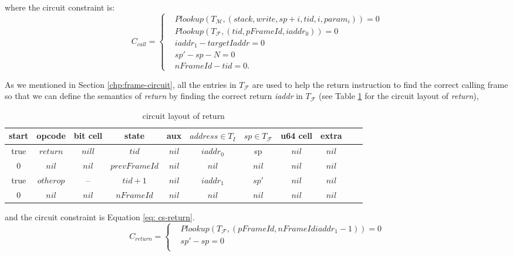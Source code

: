 \noindent where the circuit constraint is:
\[
    C_{call} = \begin{cases}
        &Plookup(T_\mathcal{M}, (stack, write, sp+i, tid, i, param_i)) = 0 \\
        &Plookup(T_\mathcal{F}, (tid, pFrameId, iaddr_0)) = 0 \\
        &iaddr_1 - targetIaddr = 0\\
        &sp' - sp - N = 0 \\
        &nFrameId - tid = 0.
    \end{cases}
\]

 As we mentioned in Section \ref{chp:frame-circuit}, all the entries in $T_\mathcal{F}$ are used to help the return instruction to find the correct calling frame so that we can define the semantics of \emph{return} by finding the correct return \emph{iaddr} in $T_\mathcal{F}$ (see Table \ref{tbl:return-instruction} for the circuit layout of \emph{return}),
\begin{table}[!h]
\begin{center}
\begin{tabular}{ | c | c | c | c | c | c | c | c | c | c | c | }
  \hline
  start & opcode & bit cell & state & aux & $address \in T_{I}$ & $sp \in T_\mathcal{F}$& u64 cell & extra \\ 
  \hline
   true & $return$ & $nill$ & $tid$ & $nil$ & $iaddr_0$ & sp & $nil$ & $nil$\\ 
 \hline
   0 & $nil$ & $nil$ & $prevFrameId$ & $nil$ & $nil$ & $nil$ & $nil$ & $nil$\\ 
 \hline
   true & $otherop$ & -- & $tid + 1$ & $nil$ & $iaddr_1$ & $sp'$ & $nil$ & $nil$\\
 \hline
   0 & $nil$ & $nil$ & $nFrameId$ & $nil$ & $nil$ & $nil$ & $nil$ & $nil$\\ 
 \hline
\end{tabular}
\caption{circuit layout of return}
\label{tbl:return-instruction}
\end{center}
\end{table}
and the circuit constraint is Equation \ref{eq: cs-return}.
\begin{equation}
    C_{return} =  \begin{cases}
        &Plookup(T_\mathcal{F}, (pFrameId, nFrameId iaddr_1 - 1)) = 0 \\
        &sp' - sp = 0 \\
    \end{cases}
\label{eq: cs-return}
\end{equation}

